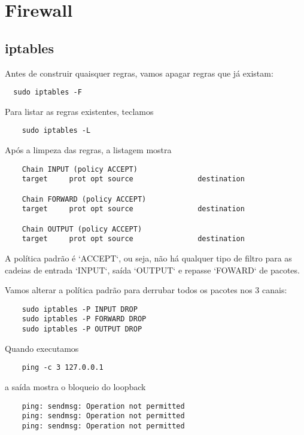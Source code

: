 \lstset{language=bash}

\section*{Firewall}

\subsection*{iptables}

Antes de construir quaisquer regras, vamos apagar regras que já existam:


\begin{lstlisting}
  sudo iptables -F
\end{lstlisting}

Para listar as regras existentes, teclamos

\begin{lstlisting}
    sudo iptables -L
 \end{lstlisting}
  
Após a limpeza das regras, a listagem mostra

\begin{lstlisting}
    Chain INPUT (policy ACCEPT)
    target     prot opt source               destination         

    Chain FORWARD (policy ACCEPT)
    target     prot opt source               destination         

    Chain OUTPUT (policy ACCEPT)
    target     prot opt source               destination
  \end{lstlisting}
  
A política padrão é `ACCEPT`, ou seja, não há qualquer tipo de filtro
para as cadeias de entrada `INPUT`, saída `OUTPUT` e repasse `FOWARD`
de pacotes.

Vamos alterar a política padrão para derrubar todos os pacotes nos 3
canais:

\begin{lstlisting}
    sudo iptables -P INPUT DROP
    sudo iptables -P FORWARD DROP
    sudo iptables -P OUTPUT DROP
  \end{lstlisting}
  
Quando executamos

\begin{lstlisting}
    ping -c 3 127.0.0.1
  \end{lstlisting}
  
\noindent a saída mostra o bloqueio do loopback

\begin{lstlisting}
    ping: sendmsg: Operation not permitted
    ping: sendmsg: Operation not permitted
    ping: sendmsg: Operation not permitted
  \end{lstlisting}
  
